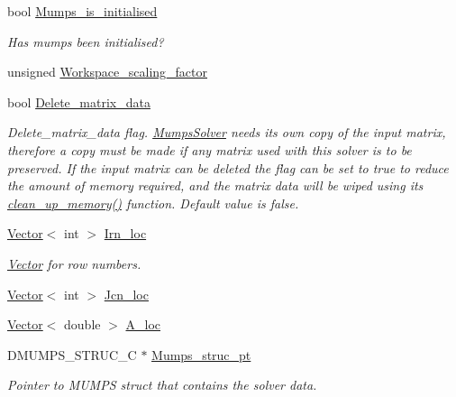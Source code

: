 \begin{DoxyCompactItemize}
bool \hyperlink{classoomph_1_1MumpsSolver_a3512c04b1bfcf11064c0da453ba34806}{Mumps\+\_\+is\+\_\+initialised}
\begin{DoxyCompactList}\small\item\em Has mumps been initialised? \end{DoxyCompactList}\item 
unsigned \hyperlink{classoomph_1_1MumpsSolver_a78d0283ea0263a5b31b7662d7abdfcb8}{Workspace\+\_\+scaling\+\_\+factor}
\item 
bool \hyperlink{classoomph_1_1MumpsSolver_a88430ee69fb2015c48ec123b26e019e9}{Delete\+\_\+matrix\+\_\+data}
\begin{DoxyCompactList}\small\item\em Delete\+\_\+matrix\+\_\+data flag. \hyperlink{classoomph_1_1MumpsSolver}{Mumps\+Solver} needs its own copy of the input matrix, therefore a copy must be made if any matrix used with this solver is to be preserved. If the input matrix can be deleted the flag can be set to true to reduce the amount of memory required, and the matrix data will be wiped using its \hyperlink{classoomph_1_1MumpsSolver_adc1541e4a9cbbe9c641f988380618713}{clean\+\_\+up\+\_\+memory()} function. Default value is false. \end{DoxyCompactList}\item 
\hyperlink{classoomph_1_1Vector}{Vector}$<$ int $>$ \hyperlink{classoomph_1_1MumpsSolver_a969c7e01bcce31a946e01f03953e0745}{Irn\+\_\+loc}
\begin{DoxyCompactList}\small\item\em \hyperlink{classoomph_1_1Vector}{Vector} for row numbers. \end{DoxyCompactList}\item 
\hyperlink{classoomph_1_1Vector}{Vector}$<$ int $>$ \hyperlink{classoomph_1_1MumpsSolver_a593d7783708440445e09b6d595168cce}{Jcn\+\_\+loc}
\item 
\hyperlink{classoomph_1_1Vector}{Vector}$<$ double $>$ \hyperlink{classoomph_1_1MumpsSolver_a5b40d6e4d26ada5edef87bc1fa511d06}{A\+\_\+loc}
\item 
D\+M\+U\+M\+P\+S\+\_\+\+S\+T\+R\+U\+C\+\_\+C $\ast$ \hyperlink{classoomph_1_1MumpsSolver_a0cf148106cf3cc86e238ae4f289be0f8}{Mumps\+\_\+struc\+\_\+pt}
\begin{DoxyCompactList}\small\item\em Pointer to M\+U\+M\+PS struct that contains the solver data. \end{DoxyCompactList}\end{DoxyCompactItemize}
